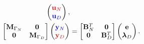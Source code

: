 \documentclass[aspectratio=169]{ISAE-Beamer}
\begin{document}
\begin{frame}
\begin{equation*}
\begin{aligned}
\begin{pmatrix}
	\textcolor{red}{\mathbf{u}_N} \\
	\textcolor{blue}{\mathbf{u}_D} \\
	\end{pmatrix}, \\
	\begin{bmatrix}
	\mathbf{M}_{\Gamma_N} & \mathbf{0} \\
	\mathbf{0} & \mathbf{M}_{\Gamma_D} \\
	\end{bmatrix}
	\begin{pmatrix}
	\textcolor{blue}{\mathbf{y}_N} \\
	\textcolor{red}{\mathbf{y}_D} \\
	\end{pmatrix} &=
	\begin{bmatrix}
	\mathbf{B}_N^T & \mathbf{0} \\ 
	\mathbf{0} & \mathbf{B}_D^T \\ 
	\end{bmatrix}
	\begin{pmatrix}
	\mathbf{e}\\
	\bm{\lambda}_D \\
	\end{pmatrix}.
	\end{aligned}
	\end{equation*}
	
\end{frame}
\end{document}
